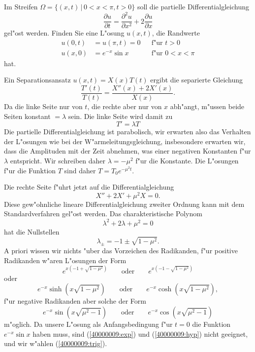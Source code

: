 Im Streifen $\Omega=\{ (x,t)\, |\, 0<x<\pi, t > 0\}$ soll die partielle
Differentialgleichung
\[
\frac{\partial u}{\partial t}
=
\frac{\partial^2 u}{\partial x^2}+2\frac{\partial u}{\partial x}
\]
gel"ost werden. Finden Sie eine L"osung $u(x,t)$, die Randwerte
\begin{align*}
u(0,t)&=u(\pi,t)=0&&\text{f"ur $t>0$}\\
u(x,0)&=e^{-x}\sin x&&\text{f"ur $0<x<\pi$}
\end{align*}
hat.

\begin{loesung}
Ein Separationsansatz $u(x,t)=X(x)T(t)$ ergibt die separierte Gleichung
\[
\frac{T'(t)}{T(t)}
=
\frac{X''(x)+2X'(x)}{X(x)}.
\]
Da die linke Seite nur von $t$, die rechte aber nur von $x$ abh"angt,
m"ussen beide Seiten konstant $=\lambda$ sein. Die linke Seite wird
damit zu
\[
T' = \lambda T
\]
Die partielle Differentialgleichung ist parabolisch, wir erwarten also
das Verhalten der L"osungen wie bei der W"armeleitungsgleichung, insbesondere
erwarten wir, dass die Amplituden mit der Zeit abnehmen, was einer
negativen Konstanten f"ur $\lambda$ entspricht. Wir schreiben daher
$\lambda=-\mu^2$ f"ur die Konstante.
Die L"osungen f"ur die Funktion $T$ sind daher $T=T_0e^{-\mu^2t}$.

Die rechte Seite f"uhrt jetzt auf die Differentialgleichung
\[
X''+2X'+\mu^2X=0.
\]
Diese gew"ohnliche lineare Differentialgleichung zweiter Ordnung
kann mit dem Standardverfahren gel"ost werden. Das charakteristische
Polynom 
\[
\lambda^2+2\lambda +\mu^2=0
\]
hat die Nullstellen
\[
\lambda_{\pm}=-1\pm\sqrt{1-\mu^2}.
\]
A priori wissen wir nichts "uber das Vorzeichen des Radikanden,
f"ur positive Radikanden w"aren L"osungen der Form
\begin{equation}
e^{x(-1+ \sqrt{1-\mu^2})}
\qquad
\text{oder}
\qquad
e^{x(-1-\sqrt{1-\mu^2})}
\label{40000009:exp}
\end{equation}
oder
\begin{equation}
e^{-x}\sinh(x\sqrt{1-\mu^2})
\qquad
\text{oder}
\qquad
e^{-x}\cosh(x\sqrt{1-\mu^2}),
\label{40000009:hyp}
\end{equation}
f"ur negative Radikanden aber solche der Form
\begin{equation}
e^{-x}\sin(x\sqrt{\mu^2-1})
\qquad
\text{oder}
\qquad
e^{-x}\cos(x\sqrt{\mu^2-1})
\label{40000009:trig}
\end{equation}
m"oglich. Da unsere L"osung als Anfangsbedingung f"ur $t=0$ die
Funktion $e^{-x}\sin x$ haben muss, sind (\ref{40000009:exp}) 
und (\ref{40000009:hyp}) nicht geeignet, und wir
w"ahlen (\ref{40000009:trig}).


\end{loesung}

